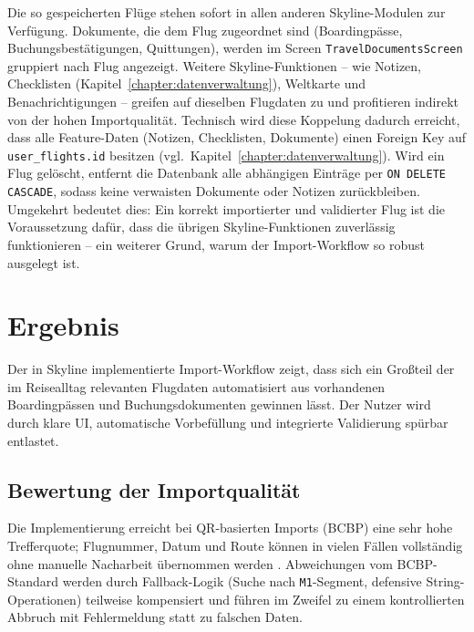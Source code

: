 Die so gespeicherten Flüge stehen sofort in allen anderen Skyline-Modulen zur Verfügung.
Dokumente, die dem Flug zugeordnet sind (Boardingpässe, Buchungsbestätigungen, Quittungen), werden im Screen \texttt{TravelDocumentsScreen} gruppiert nach Flug angezeigt.
Weitere Skyline-Funktionen -- wie Notizen, Checklisten (Kapitel~\ref{chapter:datenverwaltung}), Weltkarte und Benachrichtigungen -- greifen auf dieselben Flugdaten zu und profitieren indirekt von der hohen Importqualität.
Technisch wird diese Koppelung dadurch erreicht, dass alle Feature-Daten (Notizen, Checklisten, Dokumente) einen Foreign Key auf \texttt{user\_flights.id} besitzen (vgl.\ Kapitel~\ref{chapter:datenverwaltung}).
Wird ein Flug gelöscht, entfernt die Datenbank alle abhängigen Einträge per \texttt{ON DELETE CASCADE}, sodass keine verwaisten Dokumente oder Notizen zurückbleiben.
Umgekehrt bedeutet dies: Ein korrekt importierter und validierter Flug ist die Voraussetzung dafür, dass die übrigen Skyline-Funktionen zuverlässig funktionieren -- ein weiterer Grund, warum der Import-Workflow so robust ausgelegt ist.

\section{Ergebnis}

Der in Skyline implementierte Import-Workflow zeigt, dass sich ein Großteil der im Reisealltag relevanten Flugdaten automatisiert aus vorhandenen Boardingpässen und Buchungsdokumenten gewinnen lässt.
Der Nutzer wird durch klare UI, automatische Vorbefüllung und integrierte Validierung spürbar entlastet.

\subsection{Bewertung der Importqualität}

Die Implementierung erreicht bei QR-basierten Imports (BCBP) eine sehr hohe Trefferquote; Flugnummer, Datum und Route können in vielen Fällen vollständig ohne manuelle Nacharbeit übernommen werden \cite{iataBCBP}.
Abweichungen vom BCBP-Standard werden durch Fallback-Logik (Suche nach \texttt{M1}-Segment, defensive String-Operationen) teilweise kompensiert und führen im Zweifel zu einem kontrollierten Abbruch mit Fehlermeldung statt zu falschen Daten.

